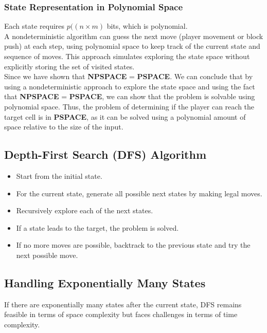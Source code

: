 \documentclass{article}
\begin{document}
\subsubsection*{State Representation in Polynomial Space}
Each state requires \( p((n \times m)\) bits, which is polynomial.
\\
A nondeterministic algorithm can guess the next move (player movement or block push) at each step, using polynomial space to keep track of the current state and sequence of moves. This approach simulates exploring the state space without explicitly storing the set of visited states.
\\
Since we have shown that \textbf{NPSPACE} = \textbf{PSPACE}.
We can conclude that by using a nondeterministic approach to explore the state space and using the fact that \textbf{NPSPACE} = \textbf{PSPACE}, we can show that the problem is solvable using polynomial space. Thus, the problem of determining if the player can reach the target cell is in \textbf{PSPACE}, as it can be solved using a polynomial amount of space relative to the size of the input.

\subsection*{Depth-First Search (DFS) Algorithm}
\begin{itemize}
    \item Start from the initial state.
    \item For the current state, generate all possible next states by making legal moves.
    \item Recursively explore each of the next states.
    \item If a state leads to the target, the problem is solved.
    \item If no more moves are possible, backtrack to the previous state and try the next possible move.
\end{itemize}

\subsection*{Handling Exponentially Many States}
If there are exponentially many states after the current state, DFS remains feasible in terms of space complexity but faces challenges in terms of time complexity.
\end{document}
